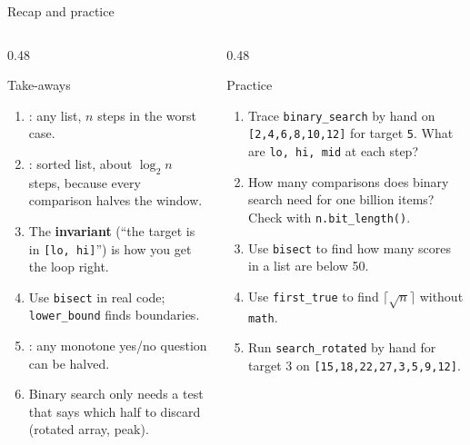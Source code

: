 \documentclass[aspectratio=169,10pt]{beamer}
\begin{document}
\begin{frame}{Recap and practice}
\begin{columns}[T]
\begin{column}{0.48\textwidth}
\begin{block}{Take-aways}
{\small
\begin{enumerate}\setlength\itemsep{3pt}
\item {}: any list, $n$ steps in the worst case.
\item {}: sorted list, about $\log_2 n$ steps, because every comparison halves the window.
\item The \textbf{invariant} (``the target is in \texttt{[lo, hi]}'') is how you get the loop right.
\item Use \texttt{bisect} in real code; \texttt{lower\_bound} finds boundaries.
\item {}: any monotone yes/no question can be halved.
\item Binary search only needs a test that says which half to discard (rotated array, peak).
\end{enumerate}}
\end{block}
\end{column}
\begin{column}{0.48\textwidth}
\begin{block}{Practice}
{\small
\begin{enumerate}\setlength\itemsep{3pt}
\item Trace \texttt{binary\_search} by hand on \texttt{[2,4,6,8,10,12]} for target \texttt{5}. What are \texttt{lo, hi, mid} at each step?
\item How many comparisons does binary search need for one billion items? Check with \texttt{n.bit\_length()}.
\item Use \texttt{bisect} to find how many scores in a list are below 50.
\item Use \texttt{first\_true} to find $\lceil\sqrt n\rceil$ without \texttt{math}.
\item Run \texttt{search\_rotated} by hand for target 3 on \texttt{[15,18,22,27,3,5,9,12]}.
\end{enumerate}}
\end{block}
\end{column}
\end{columns}
\end{frame}
\end{document}

